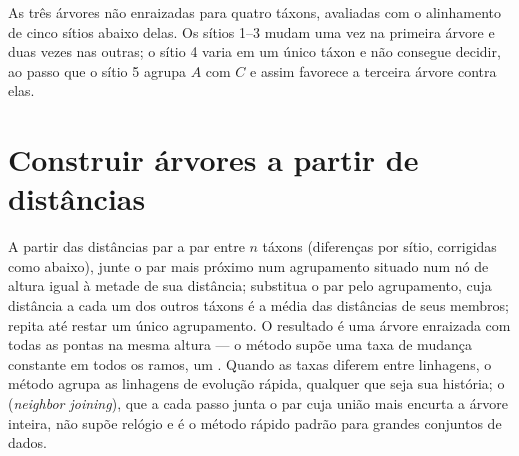 \begin{omfigure}

{\small As três árvores não enraizadas para quatro táxons, avaliadas
com o alinhamento de cinco sítios abaixo delas. Os sítios 1--3 mudam uma
vez na primeira árvore e duas vezes nas outras; o sítio 4 varia em um único táxon
e não consegue decidir, ao passo que o sítio 5 agrupa $A$ com $C$ e assim
favorece a terceira árvore contra elas.}
\end{omfigure}

\section{Construir árvores a partir de distâncias}

\begin{method}\label{meth:b2:phylogenetic-trees:upgma}
A partir das distâncias par a par entre $n$ táxons (diferenças por
sítio, corrigidas como abaixo), junte o par mais próximo num
agrupamento situado num nó de altura igual à metade de sua distância;
substitua o par pelo agrupamento, cuja distância a cada um dos outros
táxons é a média das distâncias de seus membros; repita até restar um
único agrupamento. O resultado é uma árvore enraizada com todas as pontas
na mesma altura --- o método supõe uma taxa de mudança constante em
todos os ramos, um . Quando as taxas diferem entre
linhagens, o método agrupa as linhagens de evolução rápida,
qualquer que seja sua história; o \emph{}
(\textit{neighbor joining}), que a cada passo junta o par cuja união
mais encurta a árvore inteira, não supõe relógio e é o método rápido
padrão para grandes conjuntos de dados.
\end{method}

